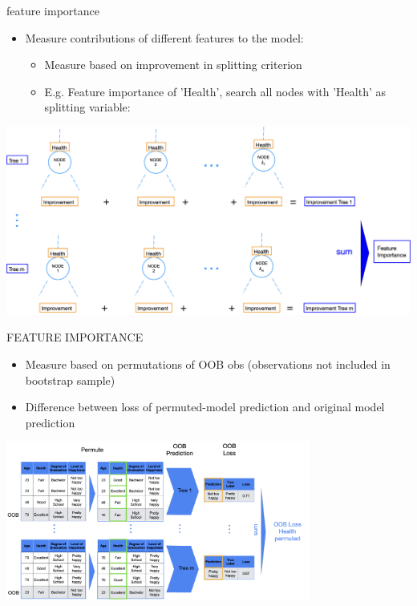\documentclass[11pt,compress,t,notes=noshow, xcolor=table]{beamer}
\begin{document}
\begin{vbframe}{feature importance}
\begin{itemize}
\item \small Measure contributions of different features to the model:
    \begin{itemize}
        \item \small Measure based on improvement in splitting criterion
        \item \small E.g. Feature importance of 'Health', search all nodes with 'Health' as splitting variable:
    \end{itemize}
\end{itemize}    


\includegraphics[width = \textwidth]{figure_man/nutshell-random-forest-feature-importance_split.png}
\end{vbframe}

\begin{vbframe}{FEATURE IMPORTANCE}
\begin{itemize}
    \item \small Measure based on permutations of OOB obs (observations not included in bootstrap sample)
    \item \small Difference between loss of permuted-model prediction and original model prediction
\end{itemize}


\begin{center}
    \includegraphics[width = 0.75\textwidth]{figure_man/nutshell-randomforest-OOB_1.png}
\end{center}

\end{vbframe}
\end{document}
